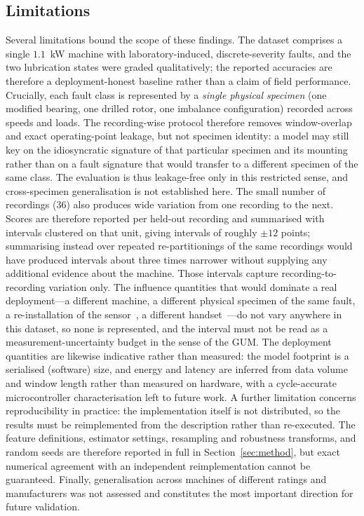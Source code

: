 \subsection{Limitations}
\label{subsec:limits}
Several limitations bound the scope of these findings. The dataset comprises a
single $1.1$~kW machine with laboratory-induced, discrete-severity faults, and the
two lubrication states were graded qualitatively; the reported accuracies are
therefore a deployment-honest baseline rather than a claim of field performance.
Crucially, each fault class is represented by a \emph{single physical specimen}
(one modified bearing, one drilled rotor, one imbalance configuration) recorded
across speeds and loads. The recording-wise protocol therefore removes
window-overlap and exact operating-point leakage, but not specimen identity: a
model may still key on the idiosyncratic signature of that particular specimen and
its mounting rather than on a fault signature that would transfer to a different
specimen of the same class. The evaluation is thus leakage-free only in this
restricted sense, and cross-specimen generalisation is not established here. The
small number of recordings ($36$) also produces wide variation from one recording
to the next. Scores are therefore reported per held-out recording and summarised
with intervals clustered on that unit, giving intervals of roughly $\pm12$ points;
summarising instead over repeated re-partitionings of the same recordings would
have produced intervals about three times narrower without supplying any
additional evidence about the machine. Those intervals capture
recording-to-recording variation only. The influence quantities that would
dominate a real deployment---a different machine, a different physical specimen of
the same fault, a re-installation of the sensor~\cite{staszewski2025mems}, a
different handset~\cite{capuano2023smartphone}---do not vary anywhere in this
dataset, so none is represented, and the interval must not be read as a
measurement-uncertainty budget in the sense of the GUM. The
deployment quantities are likewise indicative rather than measured: the model
footprint is a serialised (software) size, and energy and latency are inferred
from data volume and window length rather than measured on hardware, with a
cycle-accurate microcontroller characterisation left to future work. A further limitation concerns
reproducibility in practice: the implementation itself is not distributed, so the
results must be reimplemented from the description rather than re-executed. The
feature definitions, estimator settings, resampling and robustness transforms,
and random seeds are therefore reported in full in Section~\ref{sec:method},
but exact numerical agreement with an independent reimplementation cannot be
guaranteed. Finally,
generalisation across machines of different ratings and manufacturers was not
assessed and constitutes the most important direction for future validation.
